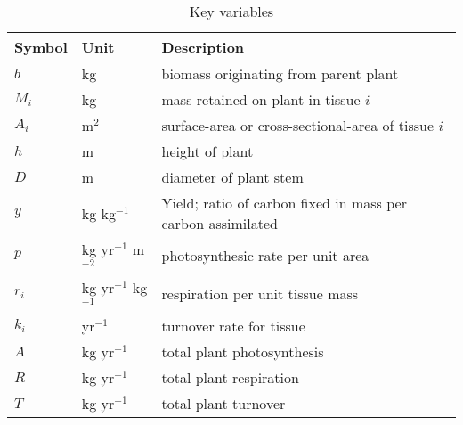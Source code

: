 \documentclass[12pt, a4paper]{article}
\begin{document}
\begin{table}[ht]
 \caption{Key variables
}
\centering

{\footnotesize  %
 \begin{doublespace}
  \begin{tabular}{p{2cm}p{2cm}p{7cm}}
  \hline
  Symbol & Unit & Description \\
  \hline

  $b$   & kg  & biomass originating from parent plant\\
  $M_i$ & kg  & mass retained on plant in tissue $i$\\
  $A_i$ & m$^2$  & surface-area or cross-sectional-area of tissue $i$\\
  $h$   & m  & height of plant\\
  $D$   & m  & diameter of plant stem\\

  $y$ & kg kg$^{-1}$ & Yield; ratio of carbon fixed in mass per carbon assimilated \\
  $p$ & kg yr$^{-1}$ m$^{-2}$  & photosynthesic rate per unit area \\
  $r_i$ & kg yr$^{-1}$ kg$^{-1}$  & respiration per unit tissue mass \\
  $k_i$ & yr$^{-1}$ & turnover rate for tissue \\
  $A$ & kg yr$^{-1}$ & total plant photosynthesis \\
  $R$ & kg yr$^{-1}$ & total plant respiration \\
  $T$ & kg yr$^{-1}$ & total plant turnover \\
  \hline
  \end{tabular}
\end{doublespace}}
\label{tab:definitions}
\end{table}

\newpage
\end{document}

